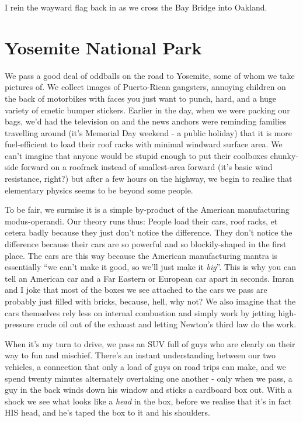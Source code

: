 \documentclass[a5paper,titlepage,11pt]{book}
\begin{document}
I rein the wayward flag back in as we cross the Bay Bridge into Oakland.

\section*{Yosemite National Park}
We pass a good deal of oddballs on the road to Yosemite, some of whom we take pictures of.  We collect images of Puerto-Rican gangsters, annoying children on the back of motorbikes with faces you just want to punch, hard, and a huge variety of emetic bumper stickers.  Earlier in the day, when we were packing our bags, we'd had the television on and the news anchors were reminding families travelling around (it's Memorial Day weekend - a public holiday) that it is more fuel-efficient to load their roof racks with minimal windward surface area.  We can't imagine that anyone would be stupid enough to put their coolboxes chunky-side forward on a roofrack instead of smallest-area forward (it's basic wind resistance, right?) but after a few hours on the highway, we begin to realise that elementary physics seems to be beyond some people.

To be fair, we surmise it is a simple by-product of the American manufacturing modus-operandi.  Our theory runs thus:  People load their cars, roof racks, et cetera badly because they just don't notice the difference.  They don't notice the difference because their cars are so powerful and so blockily-shaped in the first place.  The cars are this way because the American manufacturing mantra is essentially ``we can't make it good, so we'll just make it \emph{big}''.  This is why you can tell an American car and a Far Eastern or European car apart in seconds.  Imran and I joke that most of the boxes we see attached to the cars we pass are probably just filled with bricks, because, hell, why not?  We also imagine that the cars themselves rely less on internal combustion and simply work by jetting high-pressure crude oil out of the exhaust and letting Newton's third law do the work.

When it's my turn to drive, we pass an SUV full of guys who are clearly on their way to fun and mischief.  There's an instant understanding between our two vehicles, a connection that only a load of guys on road trips can make, and we spend twenty minutes alternately overtaking one another - only when we pass, a guy in the back winds down his window and sticks a cardboard box out.  With a shock we see what looks like a \emph{head} in the box, before we realise that it's in fact HIS head, and he's taped the box to it and his shoulders.
\end{document}
